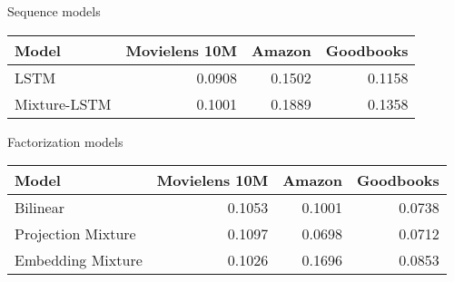 \begin{subtable}{\columnwidth}
\caption{Sequence models}
\begin{tabularx}{\columnwidth}{lrrr}
\toprule
 Model        &   Movielens 10M &   Amazon &   Goodbooks \\
\midrule
 LSTM         &          0.0908 &   0.1502 &      0.1158 \\
 Mixture-LSTM &          0.1001 &   0.1889 &      0.1358 \\
\bottomrule
\end{tabularx}
\end{subtable}
\hspace{\fill}
\begin{subtable}{\columnwidth}
\caption{Factorization models}
\begin{tabularx}{\columnwidth}{lrrr}
\toprule
 Model              &   Movielens 10M &   Amazon &   Goodbooks \\
\midrule
 Bilinear           &          0.1053 &   0.1001 &      0.0738 \\
 Projection Mixture &          0.1097 &   0.0698 &      0.0712 \\
 Embedding Mixture  &          0.1026 &   0.1696 &      0.0853 \\
\bottomrule
\end{tabularx}
\end{subtable}